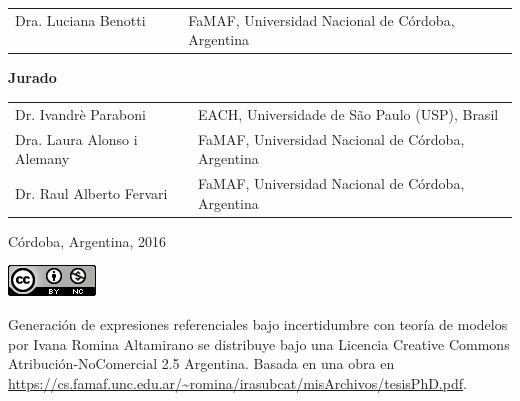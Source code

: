 \begin{center}
\begin{tabular}{ll}
Dra. Luciana Benotti $~~~~~~~~~~$ & FaMAF, Universidad Nacional de C\'ordoba, Argentina
\end{tabular}

\vspace{5mm}
\textbf{Jurado}

\vspace{5mm}

\begin{tabular}{ll}
Dr. Ivandr\`e Paraboni & EACH, Universidade de S\~ao Paulo (USP), Brasil \\
Dra. Laura Alonso i Alemany & FaMAF, Universidad Nacional de C\'ordoba, Argentina \\
Dr. Raul Alberto Fervari & FaMAF, Universidad Nacional de C\'ordoba, Argentina \\
\end{tabular}

\vspace{15mm}

\noindent C\'ordoba, Argentina, 2016

\vspace{5mm}
\includegraphics[scale=0.5]{licencia.png}
\begin{scriptsize}

Generaci\'on de expresiones referenciales bajo incertidumbre con teor\'ia de modelos por Ivana Romina Altamirano se distribuye bajo una 
Licencia Creative Commons Atribuci\'on-NoComercial 2.5 Argentina.
Basada en una obra en \url{https://cs.famaf.unc.edu.ar/~romina/irasubcat/misArchivos/tesisPhD.pdf}.
\end{scriptsize}

\end{center}
\newpage
\mbox{}
\thispagestyle{empty}
